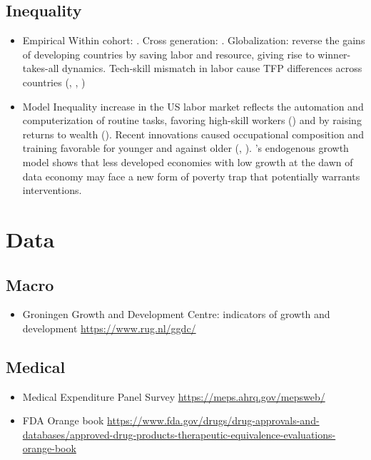 \documentclass[10pt]{article} %
\begin{document}
    \subsection{Inequality}
    \begin{itemize}
        \item Empirical\newline
        Within cohort: \cite{AcemogluRestrepo2022}. Cross generation: \cite{AdaoBerajaPandalaiNayar2020}. Globalization: reverse the gains of developing countries by saving labor and resource, giving rise to winner-takes-all dynamics. Tech-skill mismatch in labor cause TFP differences across countries  (\cite{AcemogluZilibotti2001}, \cite{Zeira2006}, \cite{KorinekStiglitz2021})

        \item Model\newline
        Inequality increase in the US labor market reflects the automation and computerization of routine tasks, favoring high-skill workers (\cite{AutorLevyMurnane2003}) and by raising returns to wealth (\cite{MollRachelRestrepo2022}). Recent innovations caused occupational composition and training favorable for younger and against older (\cite{AdaoBerajaPandalaiNayar2020}, \cite{PrettnerStrulik2020}). \cite{CongLiZhang2021}'s endogenous growth model shows that less developed economies with low growth at the dawn of data economy may face a new form of poverty trap that potentially warrants interventions.
    \end{itemize}

\newpage
\section{Data}
    \subsection{Macro}
        \begin{itemize}
            \item Groningen Growth and Development Centre: indicators of growth and development \url{https://www.rug.nl/ggdc/}
        \end{itemize}

    \subsection{Medical}
        \begin{itemize}
            \item Medical Expenditure Panel Survey \url{https://meps.ahrq.gov/mepsweb/}
            \item FDA Orange book \url{https://www.fda.gov/drugs/drug-approvals-and-databases/approved-drug-products-therapeutic-equivalence-evaluations-orange-book}
        \end{itemize}
\end{document}
